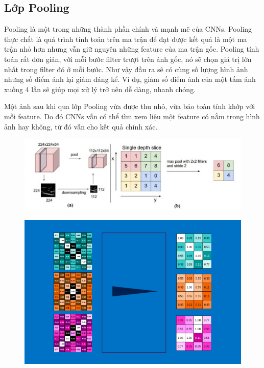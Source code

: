 \subsection{Lớp Pooling}
Pooling là một trong những thành phần chính và mạnh mẽ của CNNs. Pooling thực chất là quá trình tính toán trên ma trận để đạt được kết quả là một ma trận nhỏ hơn nhưng vẫn giữ nguyên những feature của ma trận gốc. Pooling tính toán rất đơn giản, với mỗi bước filter trượt trên ảnh gốc, nó sẽ chọn giá trị lớn nhất trong filter đó ở mỗi bước. Như vậy đầu ra sẽ có cùng số lượng hình ảnh nhưng số điểm ảnh lại giảm đáng kể. Ví dụ, giảm số điểm ảnh của một tấm ảnh xuống 4 lần sẽ giúp mọi xử lý trở nên dễ dàng, nhanh chóng.

Một ảnh sau khi qua lớp Pooling vừa được thu nhỏ, vừa bảo toàn tính khớp với mỗi feature. Do đó CNNs vẫn có thể tìm xem liệu một feature có nằm trong hình ảnh hay không, từ đó vẫn cho kết quả chính xác.

\begin{center}
    \begin{figure}[H]
    \centering
    \includegraphics[width=0.8\columnwidth]{images/chap2/pool.jpg}
    \label{fig:my_label}
    \end{figure}
\end{center}

\begin{center}
    \begin{figure}[H]
    \centering
    \includegraphics[width=0.6\columnwidth]{images/chap2/resize.png}
    \label{fig:my_label}
    \end{figure}
\end{center}

